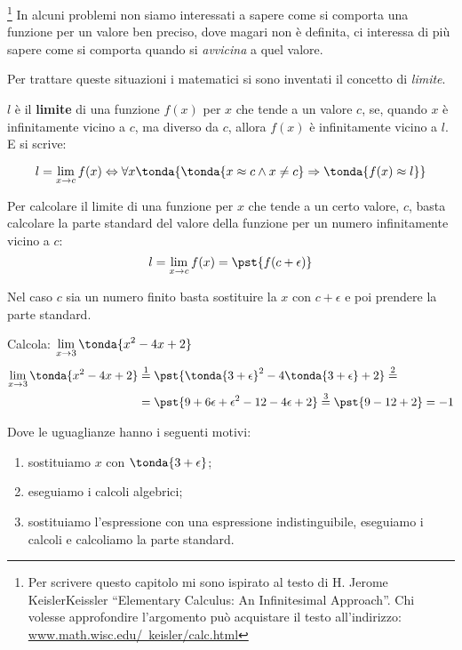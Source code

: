 \footnote{Per scrivere questo capitolo mi sono ispirato 
al testo di H. Jerome KeislerKeissler ``Elementary Calculus: An Infinitesimal 
Approach''. 
Chi volesse approfondire l'argomento può acquistare il testo 
all'indirizzo: 
\href{https://www.math.wisc.edu/~keisler/calc.html}
     {www.math.wisc.edu/~keisler/calc.html}}
In alcuni problemi non siamo interessati a sapere come si comporta una funzione 
per un valore ben preciso, dove magari non è definita, ci interessa di più 
sapere come si comporta quando si \emph{avvicina} a quel valore.

Per trattare queste situazioni i matematici si sono inventati il concetto di 
\emph{limite}.


\begin{definizione}
\(l\) è il \textbf{limite} di una funzione \(f(x)\) per \(x\) 
che tende a un 
valore \(c\), se, quando \(x\) è infinitamente vicino a \(c\), 
ma diverso da \(c\), 
allora \(f(x)\) è infinitamente vicino a \(l\). E si scrive:

\[l=\lim_{x \rightarrow c} f(x) \Leftrightarrow 
\forall x \tonda{\tonda{x \approx c \wedge x \neq c} \Rightarrow 
\tonda{f(x) \approx l}}\]
\end{definizione}

Per calcolare il limite di una funzione per $x$ che tende a un certo 
valore, $c$, basta calcolare la parte standard del valore della funzione 
per un numero infinitamente vicino a $c$:
\[l=\lim_{x \rightarrow c} f(x) = \pst{f(c+\epsilon)}\]

Nel caso $c$ sia un numero finito basta sostituire la $x$ con $c+\epsilon$ 
e poi prendere la parte standard.

\begin{esempio}
Calcola: \quad \(\displaystyle \lim_{x \rightarrow 3} \tonda{x^2-4x+2}\)
\begin{align*}
\lim_{x \rightarrow 3} \tonda{x^2-4x+2} & \stackrel{1}{=} 
  \pst{\tonda{3+\epsilon}^2-4\tonda{3+\epsilon}+2} \stackrel{2}{=}\\  
  & =\pst{9 + 6 \epsilon + \epsilon^2 - 12 - 4\epsilon + 2} \stackrel{3}{=}
  \pst{9 - 12 + 2} = -1
\end{align*}

Dove le uguaglianze hanno i seguenti motivi:
\begin{enumerate} [nosep]
 \item sostituiamo $x$ con \(\tonda{3+\epsilon}\);
 \item eseguiamo i calcoli algebrici;
 \item sostituiamo l'espressione con una espressione indistinguibile,
   eseguiamo i calcoli e calcoliamo la parte standard.
\end{enumerate}
\end{esempio}

